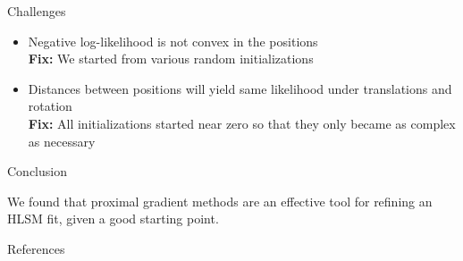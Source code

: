 \documentclass[final]{beamer}
\newlength{\onecolwid}
\begin{document}
\begin{frame}[t]
\begin{columns}[t]
\begin{column}{\onecolwid} %

  \begin{block}{Challenges}

    \begin{itemize}
    \item Negative log-likelihood is not convex in the positions\\
      \textbf{Fix:} We started from various random initializations
    \item Distances between positions will yield same likelihood under
      translations and rotation\\
      \textbf{Fix:} All initializations started near zero so that they
      only became as complex as necessary
    \end{itemize}

\end{block}


%
%



\begin{block}{Conclusion}

We found that proximal gradient methods are an effective tool for
refining an HLSM fit, given a good starting point.


\end{block}



 \begin{block}{References}

 \nocite{*} %
 \small{
 \vspace{0.75in}}


\end{block}
\end{column}
\end{columns}
\end{frame}
\end{document}
